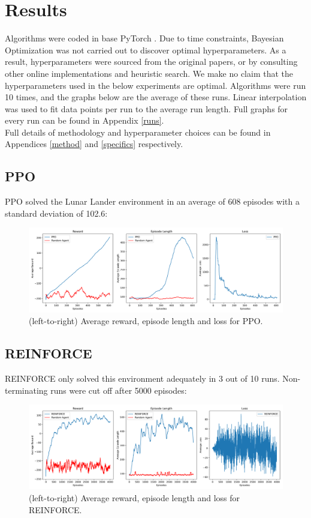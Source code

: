 \documentclass{article}
\begin{document}
\section{Results}
Algorithms were coded in base PyTorch \citep{NEURIPS2019_9015}. Due to time constraints, Bayesian Optimization was not carried out to discover optimal hyperparameters. As a result, hyperparameters were sourced from the original papers, or by consulting other online implementations and heuristic search. We make no claim that the hyperparameters used in the below experiments are optimal. Algorithms were run 10 times, and the graphs below are the average of these runs. Linear interpolation was used to fit data points per run to the average run length. Full graphs for every run can be found in Appendix \ref{runs}. \\\newline
Full details of methodology and hyperparameter choices can be found in Appendices \ref{method} and \ref{specifics} respectively. 
\subsection{PPO}
PPO solved the Lunar Lander environment in an average of 608 episodes with a standard deviation of 102.6:
\begin{figure}[H]
  \centering
  \includegraphics[scale=0.35]{1.png}
  \caption{(left-to-right) Average reward, episode length and loss for PPO.}
  \label{ppo}
\end{figure}
\subsection{REINFORCE}
REINFORCE only solved this environment adequately in 3 out of 10 runs. Non-terminating runs were cut off after 5000 episodes:
\begin{figure}[H]
  \centering
  \includegraphics[scale=0.35]{2.png}
  \caption{(left-to-right) Average reward, episode length and loss for REINFORCE.} 
\end{figure}
\end{document}
